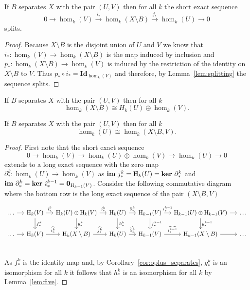 \begin{lemma}\label{lem:separate_splits}
  If $B$ separates $X$ with the pair $(U, V)$ then for all $k$ the short exact sequence
  \[ 0\to \hom_k(V)\xrightarrow{i_*} \hom_k(X\setminus B)\xrightarrow{j_*} \hom_k(U)\to 0\]
  splits.
\end{lemma}
\begin{proof}
  Because $X\setminus B$ is the disjoint union of $U$ and $V$ we know that $i_* : \hom_k(V)\to \hom_k(X\setminus B)$ is the map induced by inclusion and $p_* : \hom_k(X\setminus B)\to \hom_k(V)$ is induced by the restriction of the identity on $X\setminus B$ to $V$.
  Thus $p_*\circ i_* = \mathbf{Id}_{\hom_k(V)}$ and therefore, by Lemma~\ref{lem:splitting} the sequence splits.%
\end{proof}

\begin{corollary}\label{cor:oplus_separates}
    If $B$ separates $X$ with the pair $(U, V)$ then for all $k$
    \[ \hom_k(X\setminus B) \cong H_k(U)\oplus \hom_k(V). \]
\end{corollary}

\begin{lemma}\label{lem:iso_separates}
  If $B$ separates $X$ with the pair $(U, V)$ then for all $k$
  \[ \hom_k(U)\cong \hom_k(X\setminus B, V).\]
\end{lemma}
\begin{proof}
  First note that the short exact sequence
  \[ 0\to \hom_k(V)\to \hom_k(U)\oplus\hom_k(V)\to \hom_k(U)\to 0\]
  extends to a long exact sequence with the zero map $\partial_*^k : \hom_k(U)\to \hom_k(V)$ as $\mathbf{im}~j^k_* = \mathrm{H}_k(U) = \mathbf{ker}~\partial_*^k$ and $\mathbf{im}~\partial_*^k = \mathbf{ker}~ i^{k-1}_* = \mathbf{0}_{\mathrm{H}_{k-1}(V)}$.
  Consider the following commutative diagram where the bottom row is the long exact sequence of the pair $(X\setminus B, V)$
  \begin{small}
  \[\begin{tikzcd}[column sep=small]
    \ldots\ar[r]  & \hom_k(V)\ar[r, "i_*^k"]\ar[d, "f_*^k"]
                  & \hom_k(U)\oplus\hom_k(V)\ar[r, "j_*^k"]\ar[d, "g_*^k"]
                  & \hom_k(U)\ar[r, "\partial_*^k"]\ar[d, "h_*^k"]
                  & \hom_{k-1}(V)\ar[r, "i_*^{k-1}"]\ar[d, "f_*^{k-1}"]
                  & \hom_{k-1}(U)\oplus\hom_{k-1}(V)\ar[r]\ar[d, "g_*^{k-1}"]
                  & \ldots\\
    \ldots\ar[r]  & \hom_k(V)\ar[r, "\widehat{i_*^k}"]
                  & \hom_k(X\setminus B)\ar[r, "\widehat{j_*^k}"]
                  & \hom_k(U)\ar[r, "\widehat{\partial_*^k}"]
                  & \hom_{k-1}(V)\ar[r, "\widehat{i_*^{k-1}}"]
                  & \hom_{k-1}(X\setminus B)\ar[r]
                  & \ldots\\
  \end{tikzcd}\]
  \end{small}
  As $f_*^k$ is the identity map and, by Corollary~\ref{cor:oplus_separates}, $g^k_*$ is an isomorphism for all $k$ it follows that $h_*^k$ is an isomorphism for all $k$ by Lemma~\ref{lem:five}.
\end{proof}

